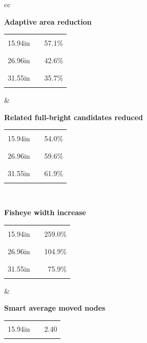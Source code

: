 \documentclass[11pt,a4paper,oneside,extrafontsizes]{memoir}
\begin{document}
\begin{center}
\begin{figure}[htbp]
\centering
\begin{tabular}{cc}
\begin{minipage}[t]{0.46\textwidth}
\centering
\textbf{Adaptive area reduction}\\[-0.2em]
\begin{tabular}{@{}r l r@{}}
15.94in & \textcolor{blue!70!black}{\rule{0.2000\textwidth}{1.1ex}} & 57.1\% \\
26.96in & \textcolor{blue!70!black}{\rule{0.1491\textwidth}{1.1ex}} & 42.6\% \\
31.55in & \textcolor{blue!70!black}{\rule{0.1249\textwidth}{1.1ex}} & 35.7\% \\
\end{tabular}
\end{minipage}
&
\begin{minipage}[t]{0.46\textwidth}
\centering
\textbf{Related full-bright candidates reduced}\\[-0.2em]
\begin{tabular}{@{}r l r@{}}
15.94in & \textcolor{blue!70!black}{\rule{0.1745\textwidth}{1.1ex}} & 54.0\% \\
26.96in & \textcolor{blue!70!black}{\rule{0.1926\textwidth}{1.1ex}} & 59.6\% \\
31.55in & \textcolor{blue!70!black}{\rule{0.2000\textwidth}{1.1ex}} & 61.9\% \\
\end{tabular}
\end{minipage} \\[1.2em]
\begin{minipage}[t]{0.46\textwidth}
\centering
\textbf{Fisheye width increase}\\[-0.2em]
\begin{tabular}{@{}r l r@{}}
15.94in & \textcolor{blue!70!black}{\rule{0.2000\textwidth}{1.1ex}} & 259.0\% \\
26.96in & \textcolor{blue!70!black}{\rule{0.0810\textwidth}{1.1ex}} & 104.9\% \\
31.55in & \textcolor{blue!70!black}{\rule{0.0586\textwidth}{1.1ex}} & 75.9\% \\
\end{tabular}
\end{minipage}
&
\begin{minipage}[t]{0.46\textwidth}
\centering
\textbf{Smart average moved nodes}\\[-0.2em]
\begin{tabular}{@{}r l r@{}}
15.94in & \textcolor{blue!70!black}{\rule{0.2000\textwidth}{1.1ex}} & 2.40 \\

\end{tabular}
\end{minipage}
\end{tabular}
\end{figure}
\end{center}
\end{document}
